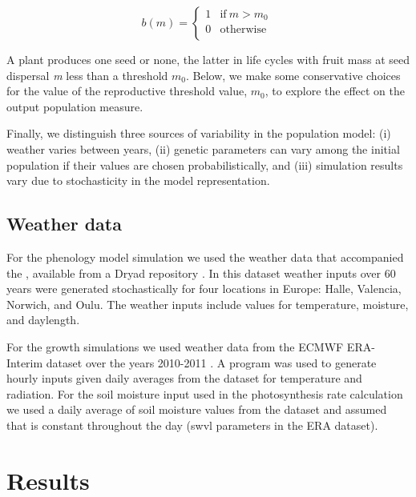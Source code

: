 \documentclass[phd]{infthesis}
\newcommand{\mr}[1]{\mathrm{#1}}
\begin{document}
\[b( m ) = \left\{ \begin{matrix}
1 & \mr{if\ }m > m_{0} \\
0 & \mr{otherwise} \\
\end{matrix} \right.\ \]

A plant produces one seed or none, the latter in life cycles with fruit
mass at seed dispersal \emph{m} less than a threshold \(m_{0}\). Below,
we make some conservative choices for the value of the reproductive
threshold value, \(m_{0}\), to explore the effect on the output
population measure.

Finally, we distinguish three sources of variability in the population
model: (i) weather varies between years, (ii) genetic parameters can
vary among the initial population if their values are chosen
probabilistically, and (iii) simulation results vary due to
stochasticity in the model representation.

\subsection{Weather data}
\label{weather-data}

For the phenology model simulation we used the weather data that accompanied the
\citet{(Burghardt et al., 2015).}, available from a Dryad repository
\citep{burghardt_data_2014}. In this dataset weather inputs over 60 years were
generated stochastically for four locations in Europe: Halle, Valencia, Norwich,
and Oulu. The weather inputs include values for temperature, moisture, and
daylength.

For the growth simulations we used weather data from the ECMWF ERA-Interim
dataset over the years 2010-2011 \citep{dee_era-interim_2011}.  A program was
used to generate hourly inputs given daily averages from the dataset for
temperature and radiation. For the soil moisture input used in the
photosynthesis rate calculation we used a daily average of soil moisture values
from the dataset and assumed that is constant throughout the day (swvl
parameters in the ERA dataset).

\section{Results}
\label{results}
\end{document}
